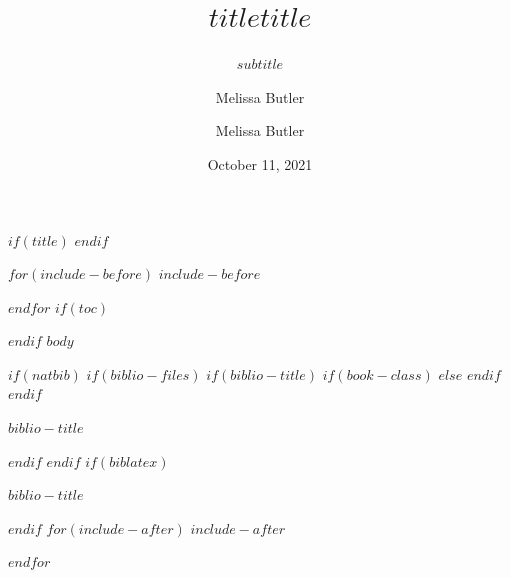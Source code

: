 \documentclass[$if(fontsize)$$fontsize$,$endif$$if(handout)$handout,$endif$$if(beamer)$ignorenonframetext,$endif$$for(classoption)$$classoption$$sep$,$endfor$]{$documentclass$}
\title[$shorttitle$]{$title$}
\title{$title$}
\subtitle{$subtitle$}
\institute[$shortinstitute$]{$institute$}
\institute{$institute$}
\author[Melissa Butler]{Melissa Butler}
\author{Melissa Butler}
\date{October 11, 2021}
\begin{document}
$if(title)$
\frame{\titlepage}
$endif$

$for(include-before)$
$include-before$

$endfor$
$if(toc)$
\begin{frame}
\tableofcontents[hideallsubsections]
\end{frame}

$endif$
$body$

$if(natbib)$
$if(biblio-files)$
$if(biblio-title)$
$if(book-class)$
\renewcommand\bibname{$biblio-title$}
$else$
\renewcommand\refname{$biblio-title$}
$endif$
$endif$
\begin{frame}[allowframebreaks]{$biblio-title$}

\end{frame}

$endif$
$endif$
$if(biblatex)$
\begin{frame}[allowframebreaks]{$biblio-title$}
\printbibliography[heading=none]
\end{frame}

$endif$
$for(include-after)$
$include-after$

$endfor$
\end{document}
